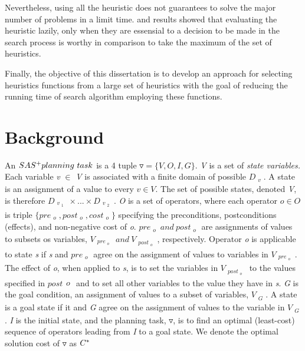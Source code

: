 \documentclass[a4paper,12pt]{article}
\begin{document}
Nevertheless, using all the heuristic does not guarantees to solve the major number of problems in a limit time. \citep{domshlak2010max} and \citep{tolpin2013towards} results showed that evaluating the heuristic lazily, only when they are essensial to a decision to be made in the search process is worthy in comparison to take the maximum of the set of heuristics.

Finally, the objective of this dissertation is to develop an approach for selecting heuristics functions from a large set of heuristics with the goal of reducing the running time of search algorithm employing these functions.

\section{Background}
An $SAS\sp{+} planning\ task$ \citep{backstrom1995complexity} is a 4 tuple $\triangledown = \{V, O, I, G\}.$ \textit{V} is a set of \textit{state variables.} Each variable \textit{v} $\in$ \textit{V} is associated with a finite domain of possible $D_{\substack{v}}$. A state is an assignment of a value to every $v \in V.$ The set of possible states, denoted \textit{V}, is therefore $D_{\substack{v_{\substack{1}}}}    \times ... \times D_{\substack{v_{\substack{2}}}}$. \textit{O} is a set of operators, where each operator $o \in O$ is triple $\{pre_{\substack{o}} , post_{\substack{o}}, cost_{\substack{o}}\}$ specifying the preconditions, postconditions (effects), and non-negative cost of \textit{o}. $pre_{\substack{o}}\ and\ post_{\substack{o}}$ are assignments of values to subsets os variables, $V_{\substack{pre_{\substack{o}}}}\ and\ V_{\substack{post_{\substack{o}}}}$, respectively. Operator \textit{o} is applicable to state \textit{s} if \textit{s} and $pre_{\substack{o}}$ agree on the assignment of values to variables in $V_{\substack{pre_{\substack{o}}}}$. The effect of \textit{o}, when applied to \textit{s}, is to set the variables in $V_{\substack{post_{\substack{o}}}}$ to the values specified in $post{\substack{o}}$ and to set all other variables to the value they have in \textit{s}. \textit{G} is the goal condition, an assignment of values to a subset of variables, $V_{\substack{G}}$. A state is a goal state if it and \textit{G} agree on the assignment of values to the variable in $V_{\substack{G}}$. \textit{I} is the initial state, and the planning task, $\triangledown$, is to find an optimal (least-cost) sequence of operators leading from \textit{I} to a goal state. We denote the optimal solution cost of $\triangledown$ as $C\sp{*}$
\end{document}
